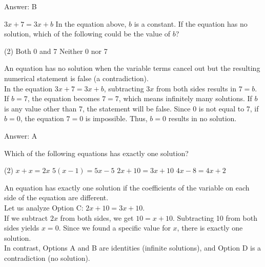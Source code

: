 \documentclass[11pt,paper=a4,answers]{exam}
\begin{document}
\begin{questions}
\begin{solution}
\vspace{20pt}
Answer: \colorbox{yellow!100}{B}
\end{solution}

\question
$3x + 7 = 3x + b$
In the equation above, $b$ is a constant. If the equation has no solution, which of the following could be the value of $b$?
\begin{tasks}(2)
    \task Both 0 and 7
    \task Neither 0 nor 7
\end{tasks}

\begin{solution}
An equation has no solution when the variable terms cancel out but the resulting numerical statement is false (a contradiction). 
\\[10pt]
In the equation $3x + 7 = 3x + b$, subtracting $3x$ from both sides results in $7 = b$. 
\\[10pt]
If $b = 7$, the equation becomes $7 = 7$, which means infinitely many solutions. If $b$ is any value other than 7, the statement will be false. Since 0 is not equal to 7, if $b = 0$, the equation $7 = 0$ is impossible. Thus, $b=0$ results in no solution.

\vspace{20pt}
Answer: \colorbox{yellow!100}{A}
\end{solution}

\question
Which of the following equations has exactly one solution?
\begin{tasks}(2)
    \task $x + x = 2x$
    \task $5(x - 1) = 5x - 5$
    \task $2x + 10 = 3x + 10$
    \task $4x - 8 = 4x + 2$
\end{tasks}

\begin{solution}
An equation has exactly one solution if the coefficients of the variable on each side of the equation are different. 
\\[10pt]
Let us analyze Option C: $2x + 10 = 3x + 10$. 
\\[10pt]
If we subtract $2x$ from both sides, we get $10 = x + 10$. Subtracting 10 from both sides yields $x = 0$. Since we found a specific value for $x$, there is exactly one solution. 
\\[10pt]
In contrast, Options A and B are identities (infinite solutions), and Option D is a contradiction (no solution).


\end{solution}
\end{questions}
\end{document}
